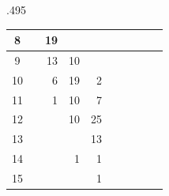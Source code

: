\begin{table}
\begin{subtable}{.495\linewidth}
{\begin{tabular}{|c|lllllllll|}
			8                                                                              & \multicolumn{1}{r|}{}   & \multicolumn{1}{r|}{19} & \multicolumn{1}{r|}{}   & \multicolumn{1}{r|}{}   & \multicolumn{1}{r|}{}   & \multicolumn{1}{r|}{}   & \multicolumn{1}{r|}{}   & \multicolumn{1}{r|}{}   &                         \\ \hline
			9                                                                              & \multicolumn{1}{r|}{}   & \multicolumn{1}{r|}{13} & \multicolumn{1}{r|}{10} & \multicolumn{1}{r|}{}   & \multicolumn{1}{r|}{}   & \multicolumn{1}{r|}{}   & \multicolumn{1}{r|}{}   & \multicolumn{1}{r|}{}   &                         \\ \hline
			10                                                                             & \multicolumn{1}{r|}{}   & \multicolumn{1}{r|}{6}  & \multicolumn{1}{r|}{19} & \multicolumn{1}{r|}{2}  & \multicolumn{1}{r|}{}   & \multicolumn{1}{r|}{}   & \multicolumn{1}{r|}{}   & \multicolumn{1}{r|}{}   &                         \\ \hline
			11                                                                             & \multicolumn{1}{r|}{}   & \multicolumn{1}{r|}{1}  & \multicolumn{1}{r|}{10} & \multicolumn{1}{r|}{7}  & \multicolumn{1}{r|}{}   & \multicolumn{1}{r|}{}   & \multicolumn{1}{r|}{}   & \multicolumn{1}{r|}{}   &                         \\ \hline
			12                                                                             & \multicolumn{1}{r|}{}   & \multicolumn{1}{r|}{}   & \multicolumn{1}{r|}{10} & \multicolumn{1}{r|}{25} & \multicolumn{1}{r|}{}   & \multicolumn{1}{r|}{}   & \multicolumn{1}{r|}{}   & \multicolumn{1}{r|}{}   &                         \\ \hline
			13                                                                             & \multicolumn{1}{r|}{}   & \multicolumn{1}{r|}{}   & \multicolumn{1}{r|}{}   & \multicolumn{1}{r|}{13} & \multicolumn{1}{r|}{}   & \multicolumn{1}{r|}{}   & \multicolumn{1}{r|}{}   & \multicolumn{1}{r|}{}   &                         \\ \hline
			14                                                                             & \multicolumn{1}{r|}{}   & \multicolumn{1}{r|}{}   & \multicolumn{1}{r|}{1}  & \multicolumn{1}{r|}{1}  & \multicolumn{1}{r|}{}   & \multicolumn{1}{r|}{}   & \multicolumn{1}{r|}{}   & \multicolumn{1}{r|}{}   &                         \\ \hline
			15                                                                             & \multicolumn{1}{r|}{}   & \multicolumn{1}{r|}{}   & \multicolumn{1}{r|}{}   & \multicolumn{1}{r|}{1}  & \multicolumn{1}{r|}{}   & \multicolumn{1}{r|}{}   & \multicolumn{1}{r|}{}   & \multicolumn{1}{r|}{}   &                         \\ \hline

\end{tabular}}
\end{subtable}
\end{table}
